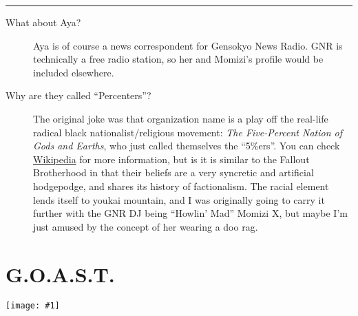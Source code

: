 \documentclass[a4paper,12pt]{book}
\newenvironment{commentary}%
	{
		\vfill%
		\hrule%
		\begin{footnotesize}%
		\color{MidnightBlue}%
	}%
	{%
		\end{footnotesize}%
	}
\newcommand{\img}[1]{%
	\texttt{[image: \#1]}%
}
\begin{document}
\begin{commentary}
\begin{description}
\item[What about Aya?] Aya is of course a news correspondent for Gensokyo News Radio. GNR is technically a free radio station, so her and Momizi's profile would be included elsewhere.
\item[Why are they called ``Percenters''?] The original joke was that organization name is a play off the real-life radical black nationalist/religious movement: \emph{The Five-Percent Nation of Gods and Earths}, who just called themselves the ``5\%ers''. You can check \href{http://en.wikipedia.org/wiki/Five-Percent\_Nation}{Wikipedia} for more information, but is it is similar to the Fallout Brotherhood in that their beliefs are a very syncretic and artificial hodgepodge, and shares its history of factionalism. The racial element lends itself to youkai mountain, and I was originally going to carry it further with the GNR DJ being ``Howlin' Mad'' Momizi X, but maybe I'm just amused by the concept of her wearing a doo rag.
\end{description}
\end{commentary}





\chapter{G.O.A.S.T.}

\img{renko-mary-night-flight}
\end{document}
